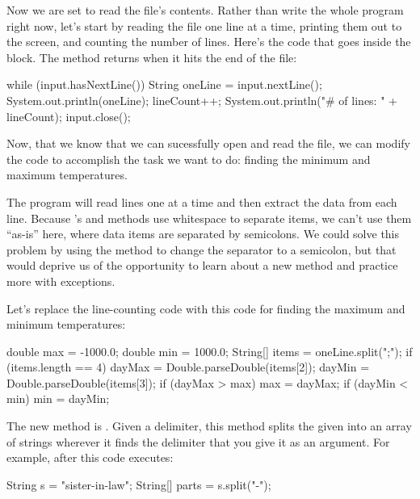 Now we are set to read the file's contents. Rather than write the whole program right now, let's start by reading the file one line at a time, printing them out to the screen, and counting the number of lines. Here's the code that goes inside the  block. The  method returns  when it hits the end of the file:

\begin{code}
            while (input.hasNextLine()) {
                String oneLine = input.nextLine();
                System.out.println(oneLine);
                lineCount++;
            }
            System.out.println("# of lines: " + lineCount);
            input.close();
\end{code}

Now, that we know that we can sucessfully open and read the file, we can modify the code to accomplish the task we want to do: finding the minimum and maximum temperatures.

The program will read lines one at a time and then extract the data from each line. Because 's  and  methods use whitespace to separate items, we can't use them ``as-is'' here, where data items are separated by semicolons. We could solve this problem by using the  method to change the separator to a semicolon, but that would deprive us of the opportunity to learn about a new  method and practice more with exceptions.

Let's replace the line-counting code with this code for finding the maximum and minimum temperatures:

\begin{code}
double max = -1000.0;
double min = 1000.0;
String[] items = oneLine.split(";");
if (items.length == 4) {
    dayMax = Double.parseDouble(items[2]);
    dayMin = Double.parseDouble(items[3]);
    if (dayMax > max) {
        max = dayMax;
    }
    if (dayMin < min) {
        min = dayMin;
    }
}
\end{code}

The new  method is . Given a delimiter, this method splits the given  into an array of strings wherever it finds the delimiter that you give it as an argument. For example, after this code executes:

\begin{code}
String s = "sister-in-law";
String[] parts = s.split("-");
\end{code}

